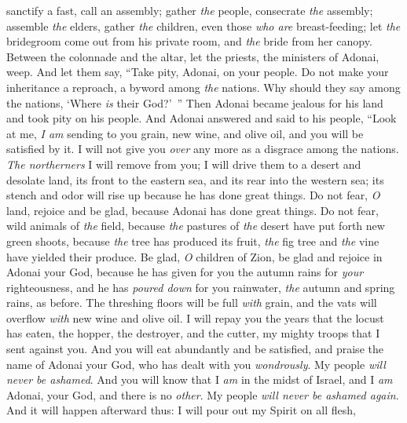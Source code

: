 \begin{biblechapter}
sanctify a fast, call an assembly;
\verse gather \textit{the} people, consecrate \textit{the} assembly; 
assemble \textit{the} elders, gather \textit{the} children, 
even those \textit{who are} breast-feeding; 
let \textit{the} bridegroom come out from his private room, 
and \textit{the} bride from her canopy.
\verse Between the colonnade and the altar, 
let the priests, the ministers of Adonai, weep. 
And let them say, “Take pity, Adonai, on your people. 
Do not make your inheritance a reproach, 
a byword among \textit{the} nations. 
Why should they say among the nations, 
‘Where \textit{is} their God?’ ”
 Then Adonai became jealous for his land 
and took pity on his people.
\verse And Adonai answered and said to his people, 
“Look at me, \textit{I am} sending to you 
grain, new wine, and olive oil, 
and you will be satisfied by it. 
I will not give you \textit{over} any more 
as a disgrace among the nations.
\verse \textit{The northerners} 
I will remove from you; 
I will drive them to a desert 
and desolate land, 
its front to the eastern sea, 
and its rear into the western sea; 
its stench and odor will rise up 
because he has done great things.
\verse Do not fear, \textit{O} land, 
rejoice and be glad, 
because Adonai has done great things.
\verse Do not fear, wild animals of \textit{the} field, 
because \textit{the} pastures of \textit{the} desert have put forth new green shoots, 
because \textit{the} tree has produced its fruit, 
\textit{the} fig tree and \textit{the} vine 
have yielded their produce.
\verse Be glad, \textit{O} children of Zion, 
be glad and rejoice in Adonai your God, 
because he has given for you 
the autumn rains for \textit{your} righteousness, 
and he has \textit{poured down} for you rainwater, 
\textit{the} autumn and spring rains, as before.
\verse The threshing floors will be full \textit{with} grain, 
and the vats will overflow 
\textit{with} new wine and olive oil.
\verse I will repay you the years 
that the locust has eaten, 
the hopper, the destroyer, and the cutter, 
my mighty troops that I sent against you.
\verse And you will eat abundantly and be satisfied, 
and praise the name of Adonai your God, 
who has dealt with you \textit{wondrously}. 
My people \textit{will never be ashamed}.
\verse And you will know that I \textit{am} in the midst of Israel, 
and I \textit{am} Adonai, 
your God, and there is no \textit{other}. 
My people \textit{will never be ashamed again}.
  And it will happen afterward thus: 
I will pour out my Spirit on all flesh, 

\end{biblechapter}
